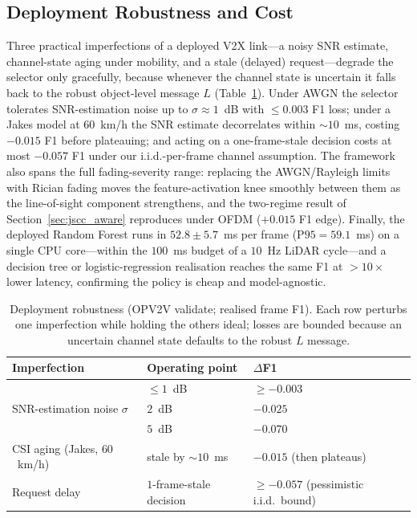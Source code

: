 \documentclass[journal]{IEEEtran}
\begin{document}
\subsection{Deployment Robustness and Cost}\label{sec:robustness}

Three practical imperfections of a deployed V2X link---a noisy SNR estimate, channel-state
aging under mobility, and a stale (delayed) request---degrade the selector only gracefully,
because whenever the channel state is uncertain it falls back to the robust object-level
message $L$ (Table~\ref{tab:robustness}). Under AWGN the selector tolerates SNR-estimation
noise up to $\sigma\approx1$~dB with $\le0.003$ F1 loss; under a Jakes model at $60$~km/h the
SNR estimate decorrelates within ${\sim}10$~ms, costing $-0.015$ F1 before plateauing; and
acting on a one-frame-stale decision costs at most $-0.057$ F1 under our i.i.d.-per-frame
channel assumption. The framework also spans the full fading-severity range: replacing the
AWGN/Rayleigh limits with Rician fading moves the feature-activation knee smoothly between
them as the line-of-sight component strengthens, and the two-regime result of
Section~\ref{sec:jscc_aware} reproduces under OFDM ($+0.015$ F1 edge). Finally, the deployed
Random Forest runs in $52.8\pm5.7$~ms per frame ($\mathrm{P95}=59.1$~ms) on a single CPU
core---within the $100$~ms budget of a $10$~Hz LiDAR cycle---and a decision tree or
logistic-regression realisation reaches the same F1 at $>10\times$ lower latency, confirming
the policy is cheap and model-agnostic.

\begin{table}[t]
\centering
\caption{Deployment robustness (OPV2V validate; realised frame F1). Each row perturbs one
imperfection while holding the others ideal; losses are bounded because an uncertain channel
state defaults to the robust $L$ message.}
\label{tab:robustness}
\begin{tabular}{lll}
\toprule
Imperfection & Operating point & $\Delta$F1 \\
\midrule
\multirow{3}{*}{SNR-estimation noise $\sigma$}
   & $\le 1$~dB              & $\ge -0.003$ \\
   & $2$~dB                  & $-0.025$ \\
   & $5$~dB                  & $-0.070$ \\
\midrule
CSI aging (Jakes, $60$~km/h) & stale by ${\sim}10$~ms & $-0.015$ (then plateaus) \\
\midrule
Request delay & $1$-frame-stale decision & $\ge -0.057$ (pessimistic i.i.d.\ bound) \\
\bottomrule
\end{tabular}
\end{table}
\end{document}
